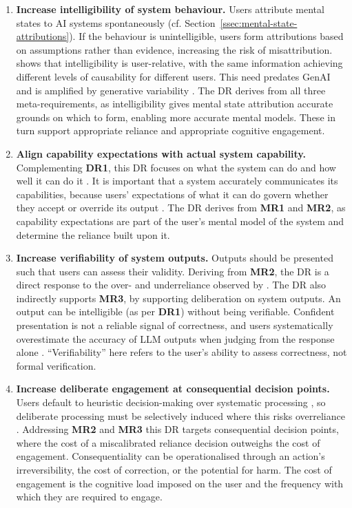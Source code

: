 \begin{enumerate}[label=\textbf{DR\arabic*}, leftmargin=*]
    \item \textbf{Increase intelligibility of system behaviour.} Users attribute mental states to \ac{AI} systems spontaneously (cf. Section~\ref{ssec:mental-state-attributions}). If the behaviour is unintelligible, users form attributions based on assumptions rather than evidence, increasing the risk of misattribution. \textcite{Shin2021} shows that intelligibility is user-relative, with the same information achieving different levels of causability for different users. This need predates \ac{GenAI} \parencite[cf. G11,][]{Amershi2019} and is amplified by generative variability \parencite{Weisz2025}. The \ac{DR} derives from all three meta-requirements, as intelligibility gives mental state attribution accurate grounds on which to form, enabling more accurate mental models. These in turn support appropriate reliance and appropriate cognitive engagement.
    \item \textbf{Align capability expectations with actual system capability.} Complementing \textbf{DR1}, this \ac{DR} focuses on what the system can do and how well it can do it \parencite[cf. G1, G2,][]{Amershi2019}. It is important that a system accurately communicates its capabilities, because users' expectations of what it can do govern whether they accept or override its output \parencite{Bansal2019}. The \ac{DR} derives from \textbf{MR1} and \textbf{MR2}, as capability expectations are part of the user's mental model of the system and determine the reliance built upon it.
    \item \textbf{Increase verifiability of system outputs.} Outputs should be presented such that users can assess their validity. Deriving from \textbf{MR2}, the \ac{DR} is a direct response to the over- and underreliance observed by \textcite{Jussupow2021}. The \ac{DR} also indirectly supports \textbf{MR3}, by supporting deliberation on system outputs. An output can be intelligible (as per \textbf{DR1}) without being verifiable. Confident presentation is not a reliable signal of correctness, and users systematically overestimate the accuracy of \ac{LLM} outputs when judging from the response alone \parencite{Steyvers2025}. \enquote{Verifiability} here refers to the user's ability to assess correctness, not formal verification.
    \item \textbf{Increase deliberate engagement at consequential decision points.} Users default to heuristic decision-making over systematic processing \parencite{Jussupow2021}, so deliberate processing must be selectively induced where this risks overreliance \parencite{Buinca2021}. Addressing \textbf{MR2} and \textbf{MR3} this \ac{DR} targets consequential decision points, where the cost of a miscalibrated reliance decision outweighs the cost of engagement. Consequentiality can be operationalised through an action's irreversibility, the cost of correction, or the potential for harm. The cost of engagement is the cognitive load imposed on the user and the frequency with which they are required to engage.

\end{enumerate}
